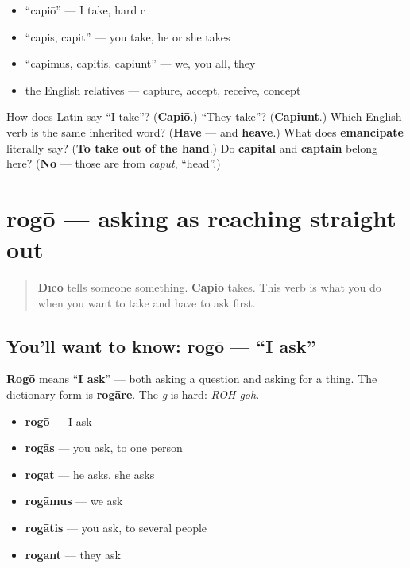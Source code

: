 \begin{itemize}
\raggedright
  \item \textquotedblleft{}capiō\textquotedblright{} — I take, hard c
  \item \textquotedblleft{}capis, capit\textquotedblright{} — you take, he or she takes
  \item \textquotedblleft{}capimus, capitis, capiunt\textquotedblright{} — we, you all, they
  \item the English relatives — capture, accept, receive, concept
\end{itemize}

\begin{tcolorbox}[breakable,colback=teal!4,colframe=teal!35!black,title={Before you move on}]
How does Latin say \textquotedblleft{}I take\textquotedblright{}? (\textbf{Capiō}.) \textquotedblleft{}They take\textquotedblright{}? (\textbf{Capiunt}.) Which English verb is the same inherited word? (\textbf{Have} — and \textbf{heave}.) What does \textbf{emancipate} literally say? (\textbf{To take out of the hand}.) Do \textbf{capital} and \textbf{captain} belong here? (\textbf{No} — those are from \emph{caput}, \textquotedblleft{}head\textquotedblright{}.)
\end{tcolorbox}
\section[rogō, rogāre]{rogō — asking as reaching straight out}

\label{lesson:LA-C39-rogo}



\begin{quote}
\textbf{Dīcō} tells someone something. \textbf{Capiō} takes. This verb is what you do when you want to take and have to ask first.
\end{quote}

\subsection*{You'll want to know: rogō — \textquotedblleft{}I ask\textquotedblright{}}
\textbf{Rogō} means \textquotedblleft{}\textbf{I ask}\textquotedblright{} — both asking a question and asking for a thing. The dictionary form is \textbf{rogāre}. The \emph{g} is hard: \emph{ROH-goh}.

\begin{itemize}
\raggedright
  \item \textbf{rogō} — I ask
  \item \textbf{rogās} — you ask, to one person
  \item \textbf{rogat} — he asks, she asks
  \item \textbf{rogāmus} — we ask
  \item \textbf{rogātis} — you ask, to several people
  \item \textbf{rogant} — they ask
\end{itemize}

